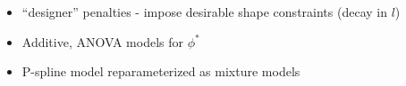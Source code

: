 \documentclass[12pt]{article}
\newcommand{\ms}{\scriptscriptstyle}
\theoremstyle{definition}
\begin{document}
\begin{itemize}
\item ``designer'' penalties - impose desirable shape constraints (decay in $l$)
\item Additive, ANOVA models for $\phi^*$
\item P-spline model reparameterized as mixture models
\end{itemize}

 



%
%
% 
\end{document}
